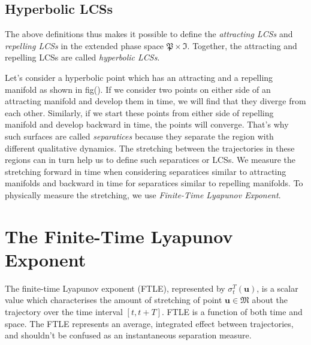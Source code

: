 \subsection{Hyperbolic LCSs}
The above definitions thus makes it possible to define the \textit{attracting LCSs} and \textit{repelling LCSs} in the extended phase space $ \mathfrak{P}\times\mathfrak{I} $. Together, the attracting and repelling LCSs are called \textit{hyperbolic LCSs}.

Let's consider a hyperbolic point which has an attracting and a repelling manifold as shown in fig(). If we consider two points on either side of an attracting manifold and develop them in time, we will find that they diverge from each other. Similarly, if we start these points from either side of repelling manifold and develop backward in time, the points will converge. That's why such surfaces are called \textit{separatices} because they separate the region with different qualitative dynamics. The stretching between the trajectories in these regions can in turn help us to define such separatices or LCSs. We measure the stretching forward in time when considering separatices similar to attracting manifolds and backward in time for separatices similar to repelling manifolds. To physically measure the stretching, we use \textit{Finite-Time Lyapunov Exponent}.

\section{The Finite-Time Lyapunov Exponent} \label{FTLE}
The finite-time Lyapunov exponent (FTLE), represented by $ \sigma_{t}^{T}(\textbf{u}) $, is a scalar value which characterises the amount of stretching of point $ \textbf{u}\in\mathfrak{M} $ about the trajectory over the time interval $ [t, t+T] $. FTLE is a function of both time and space. The FTLE represents an average, integrated effect between trajectories, and shouldn't be confused as an instantaneous separation measure. 

